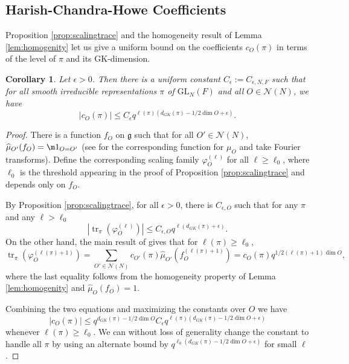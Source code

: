 \documentclass{amsart}
\newcommand{\wh}{\widehat}
\DeclareMathOperator{\tr}{tr}
\newcommand{\mf}[1]{\mathfrak{#1}}
\newcommand{\mc}[1]{\mathcal{#1}}
\newcommand{\GL}{\mathrm{GL}}
\newcommand{\eps}{\epsilon}
\newcommand{\1}{\m 1}
\newtheorem{cor}[thm]{Corollary}
\theoremstyle{remark}
\theoremstyle{definition}
\numberwithin{equation}{subsection}
\begin{document}
\subsection{Harish-Chandra-Howe Coefficients}
Proposition \ref{prop:scalingtrace} and the homogeneity result of Lemma \ref{lem:homogenity} let us give a uniform bound on the coefficients $c_{O}(\pi)$ in terms of the level of $\pi$ and its GK-dimension. 


\begin{cor}\label{cor:maincoefficientsalt}
Let $\eps > 0$. Then there is a uniform constant $C_\eps := C_{\eps, N, F}$ such that for all smooth irreducible representations $\pi$ of $\GL_N(F)$ and all $O \in \mc N(N)$, we have
\[
|c_O(\pi)| \leq C_\eps q^{\ell(\pi)(d_{GK}(\pi) - 1/2\dim O + \eps)}.
\]
\end{cor}

\begin{proof}
There is a function $f_O$ on $\mf g$ such that for all $O' \in \mc N(N)$, $\wh \mu_{O'}(f_O) = \1_{O = O'}$ (see \cite[\S6.4]{Kot05} for the corresponding function for $\mu_O$ and take Fourier transforms). Define the corresponding scaling family $\varphi_O^{(\ell)}$ for all $\ell \geq \ell_0$, where $\ell_0$ is the threshold appearing in the proof of Proposition \ref{prop:scalingtrace} and depends only on $f_{O}$. 

By Proposition \ref{prop:scalingtrace}, for all $\eps> 0$, there is $C_{\eps, O}$ such that for any $\pi$ and any $\ell > \ell_0$
\[
|\tr_\pi(\varphi_O^{(\ell)})| \leq C_{\eps,O} q^{\ell (d_{GK}(\pi) + \eps)}. 
\]
On the other hand, the main result of \cite{DB02} gives that for $\ell(\pi) \geq \ell_0$, 
\[
\tr_\pi(\varphi_O^{(\ell(\pi) + 1)}) = \sum_{O' \in \mc N(N)} c_{O'}(\pi) \wh \mu_{O'}(f^{(\ell(\pi) + 1)}_O) = c_O(\pi) q^{1/2 (\ell(\pi) + 1) \dim O},
\]
where the last equality follows from the homogeneity property of Lemma \ref{lem:homogenity} and $\wh \mu_O(f_O) = 1$. 

Combining the two equations and maximizing the constants over $O$ we have 
\[
|c_O(\pi)| \leq q^{d_{GK}(\pi) - 1/2\dim O} C_\eps q^{\ell(\pi)(d_{GK}(\pi) - 1/2\dim O + \eps)} 
\]
whenever $\ell(\pi) \geq \ell_0$. We can without loss of generality change the constant to handle all $\pi$ by using an alternate bound by $q^{\ell_0(d_{GK}(\pi) - 1/2\dim O + \eps)}$ for small $\ell$. 
\end{proof}
\end{document}
